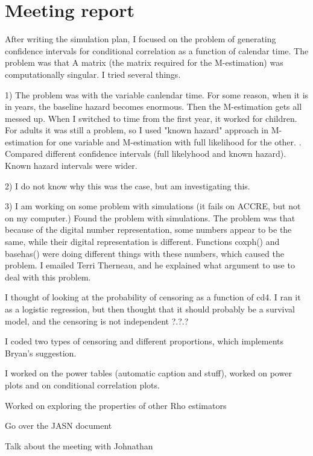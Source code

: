 \documentclass[]{article}
\begin{document}
\clearpage
\section{Meeting report}
After writing the simulation plan, I focused on the problem of generating confidence intervals for conditional correlation as a function of calendar time. The problem was that A matrix (the matrix required for the M-estimation) was computationally singular. I tried several things.

1) The problem was with the variable canlendar time. For some reason, when it is in years, the baseline hazard becomes enormous. Then the M-estimation gets all messed up. When I switched to time from the first year, it worked for children. For adults it was still a problem, so  I used "known hazard" approach in M-estimation for one variable and  M-estimation with full likelihood  for the other.
. Compared different confidence intervals (full likelyhood and known hazard). Known hazard intervals were wider.

2) I do not know why this was the case, but am investigating this.

3) I am working on some problem with simulations (it fails on ACCRE, but not on my computer.) Found the problem with simulations. The problem was that because of the digital number representation, some numbers appear to be the same, while their digital representation is different. Functions coxph() and basehas() were doing different things with these numbers, which caused the problem. I emailed Terri Therneau, and he explained what argument to use to deal with this problem.

I thought of looking at the probability of censoring as a function of cd4. I ran it as a logistic regression, but then thought that it should probably be a survival model, and the censoring is not independent ?.?.?

I coded two types of censoring and different proportions, which implements Bryan's suggestion.

I worked on the power tables (automatic caption and stuff), worked on power plots and on conditional correlation plots.

Worked on exploring the properties of other Rho estimators

Go over the JASN document

Talk about the meeting with Johnathan
\end{document}
